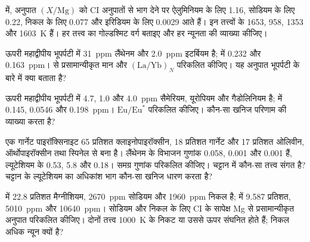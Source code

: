 \begin{exercise}[$\star$]\label{exo:b2:elements-in-the-earth:2}
 में, अनुपात $(X/\mathrm{Mg})$ को CI अनुपातों से भाग देने पर
ऐलुमिनियम के लिए 1.16, सोडियम के लिए 0.22, निकल के लिए 0.077 और
इरिडियम के लिए 0.0029 आते हैं। इन तत्त्वों के  1653, 958, 1353
और \qty{1603}{K} हैं। हर तत्त्व का गोल्डश्मिट वर्ग बताइए और हर
न्यूनता की व्याख्या कीजिए।
\end{exercise}

\begin{exercise}[$\star$]\label{exo:b2:elements-in-the-earth:3}
ऊपरी महाद्वीपीय भूपर्पटी में \qty{31}{ppm} लैंथेनम और \qty{2.0}{ppm}
इटर्बियम है;  में 0.232 और \qty{0.163}{ppm}।  से
प्रसामान्यीकृत मान और $(\mathrm{La}/\mathrm{Yb})_N$ परिकलित कीजिए। यह
अनुपात भूपर्पटी के बारे में क्या बताता है?
\end{exercise}

\begin{exercise}[$\star$]\label{exo:b2:elements-in-the-earth:4}
ऊपरी महाद्वीपीय भूपर्पटी में 4.7, 1.0 और \qty{4.0}{ppm} सैमेरियम,
यूरोपियम और गैडोलिनियम है;  में 0.145, 0.0546 और \qty{0.198}{ppm}।
$\mathrm{Eu}/\mathrm{Eu}^*$ परिकलित कीजिए। कौन-सा खनिज परिणाम की व्याख्या करता है?
\end{exercise}

\begin{exercise}[$\star\star$]\label{exo:b2:elements-in-the-earth:5}
एक गार्नेट पाइरॉक्सिनाइट 65 प्रतिशत क्लाइनोपाइरॉक्सीन, 18 प्रतिशत गार्नेट और
17 प्रतिशत ओलिवीन, ऑर्थोपाइरॉक्सीन तथा स्पिनेल से बना है। लैंथेनम के विभाजन गुणांक
0.058, 0.001 और 0.001 हैं, ल्यूटेशियम के 0.53, 5.8 और 0.18।
समग्र गुणांक परिकलित कीजिए। चट्टान में कौन-सा तत्त्व संगत है? चट्टान के
ल्यूटेशियम का अधिकांश भाग कौन-सा खनिज धारण करता है?
\end{exercise}

\begin{exercise}[$\star\star$]\label{exo:b2:elements-in-the-earth:6}
 में 22.8 प्रतिशत मैग्नीशियम, \qty{2670}{ppm}
सोडियम और \qty{1960}{ppm} निकल है;  में 9.587 प्रतिशत,
\qty{5010}{ppm} और \qty{10640}{ppm}। सोडियम और निकल के लिए CI के सापेक्ष
Mg से प्रसामान्यीकृत अनुपात परिकलित कीजिए। दोनों तत्त्व \qty{1000}{K} के निकट या उससे ऊपर संघनित होते हैं;
निकल अधिक न्यून क्यों है?
\end{exercise}

